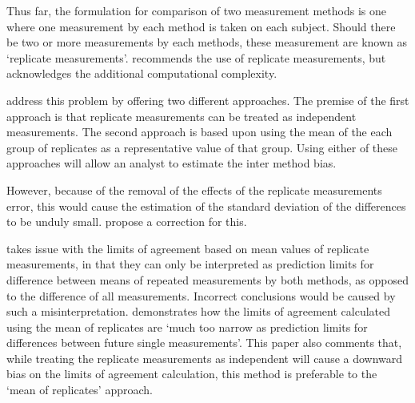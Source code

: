 \documentclass[12pt, a4paper]{report}
\theoremstyle{plain}
\theoremstyle{definition}
\theoremstyle{remark}
\begin{document}
	Thus far, the formulation for comparison of two measurement
	methods is one where one measurement by each method is taken on
	each subject. Should there be two or more measurements by each
	methods, these measurement are known as `replicate measurements'.
	\citet{BXC2008} recommends the use of replicate measurements, but
	acknowledges the additional computational complexity.
	
	\citet*{BA86} address this problem by offering two different
	approaches. The premise of the first approach is that replicate
	measurements can be treated as independent measurements. The
	second approach is based upon using the mean of the each group of
	replicates as a representative value of that group. Using either
	of these approaches will allow an analyst to estimate the inter
	method bias.
	
	
	However, because of the removal of the effects of the replicate
	measurements error, this would cause the estimation of the
	standard deviation of the differences to be unduly small.
	\citet*{BA86} propose a correction for this.
	
	\citet{BXC2008} takes issue with the limits of agreement based on
	mean values of replicate measurements, in that they can only be interpreted as prediction
	limits for difference between means of repeated measurements by
	both methods, as opposed to the difference of all measurements.
	Incorrect conclusions would be caused by such a misinterpretation.
	\citet{BXC2008} demonstrates how the limits of agreement
	calculated using the mean of replicates are `much too narrow as
	prediction limits for differences between future single
	measurements'. This paper also comments that, while treating the
	replicate measurements as independent will cause a downward bias
	on the limits of agreement calculation, this method is preferable
	to the `mean of replicates' approach.
	
	
	

	
\end{document}
